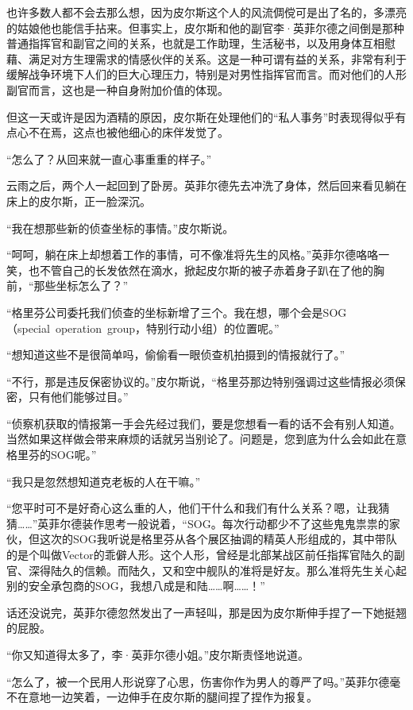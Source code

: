 也许多数人都不会去那么想，因为皮尔斯这个人的风流倜傥可是出了名的，多漂亮的姑娘他也能信手拈来。但事实上，皮尔斯和他的副官李·英菲尔德之间倒是那种普通指挥官和副官之间的关系，也就是工作助理，生活秘书，以及用身体互相慰藉、满足对方生理需求的情感伙伴的关系。这是一种可谓有益的关系，非常有利于缓解战争环境下人们的巨大心理压力，特别是对男性指挥官而言。而对他们的人形副官而言，这也是一种自身附加价值的体现。

但这一天或许是因为酒精的原因，皮尔斯在处理他们的“私人事务”时表现得似乎有点心不在焉，这点也被他细心的床伴发觉了。

“怎么了？从回来就一直心事重重的样子。”

云雨之后，两个人一起回到了卧房。英菲尔德先去冲洗了身体，然后回来看见躺在床上的皮尔斯，正一脸深沉。

“我在想那些新的侦查坐标的事情。”皮尔斯说。

“呵呵，躺在床上却想着工作的事情，可不像准将先生的风格。”英菲尔德咯咯一笑，也不管自己的长发依然在滴水，掀起皮尔斯的被子赤着身子趴在了他的胸前，“那些坐标怎么了？”

“格里芬公司委托我们侦查的坐标新增了三个。我在想，哪个会是SOG（special operation group，特别行动小组）的位置呢。”

“想知道这些不是很简单吗，偷偷看一眼侦查机拍摄到的情报就行了。”

“不行，那是违反保密协议的。”皮尔斯说，“格里芬那边特别强调过这些情报必须保密，只有他们能够过目。”

“侦察机获取的情报第一手会先经过我们，要是您想看一看的话不会有别人知道。当然如果这样做会带来麻烦的话就另当别论了。问题是，您到底为什么会如此在意格里芬的SOG呢。”

“我只是忽然想知道克老板的人在干嘛。”

“您平时可不是好奇心这么重的人，他们干什么和我们有什么关系？嗯，让我猜猜……”英菲尔德装作思考一般说着，“SOG。每次行动都少不了这些鬼鬼祟祟的家伙，但这次的SOG我听说是格里芬从各个展区抽调的精英人形组成的，其中带队的是个叫做Vector的乖僻人形。这个人形，曾经是北部某战区前任指挥官陆久的副官、深得陆久的信赖。而陆久，又和空中舰队的准将是好友。那么准将先生关心起别的安全承包商的SOG，我想八成是和陆……啊……！”

话还没说完，英菲尔德忽然发出了一声轻叫，那是因为皮尔斯伸手捏了一下她挺翘的屁股。

“你又知道得太多了，李·英菲尔德小姐。”皮尔斯责怪地说道。

“怎么了，被一个民用人形说穿了心思，伤害你作为男人的尊严了吗。”英菲尔德毫不在意地一边笑着，一边伸手在皮尔斯的腿间捏了捏作为报复。

